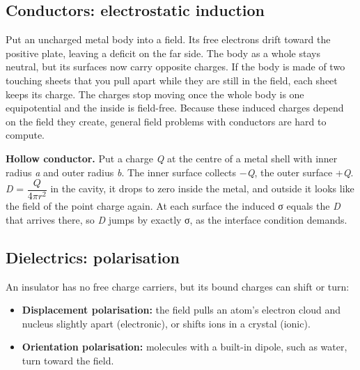 \documentclass[11pt]{article}
\begin{document}
\begin{keepsection}
\begin{keepsection}
\subsection{Conductors: electrostatic induction}

Put an uncharged metal body into a field. Its free electrons drift toward the positive plate, leaving a deficit on the far side. The body as a whole stays neutral, but its surfaces now carry opposite charges. If the body is made of two touching sheets that you pull apart while they are still in the field, each sheet keeps its charge. The charges stop moving once the whole body is one equipotential and the inside is field-free. Because these induced charges depend on the field they create, general field problems with conductors are hard to compute.

\textbf{Hollow conductor.} Put a charge \textit{Q} at the centre of a metal shell with inner radius \textit{a} and outer radius \textit{b}. The inner surface collects \ensuremath{-}\textit{Q}, the outer surface +\textit{Q}. \textit{D} = {\small\ensuremath{\dfrac{{Q}}{4π{r}^{2}}}} in the cavity, it drops to zero inside the metal, and outside it looks like the field of the point charge again. At each surface the induced σ equals the \textit{D} that arrives there, so \textit{D} jumps by exactly σ, as the interface condition demands.
\end{keepsection}

\begin{keepsection}
\subsection{Dielectrics: polarisation}

An insulator has no free charge carriers, but its bound charges can shift or turn:

\begin{itemize}
\item \textbf{Displacement polarisation:} the field pulls an atom’s electron cloud and nucleus slightly apart (electronic), or shifts ions in a crystal (ionic).
\item \textbf{Orientation polarisation:} molecules with a built-in dipole, such as water, turn toward the field.
\end{itemize}


\end{keepsection}
\end{keepsection}
\end{document}
